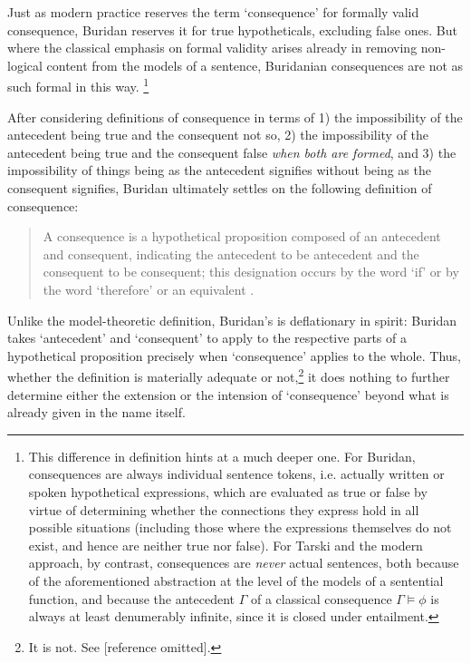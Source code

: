 \documentclass[]{article}
\begin{document}
Just as modern practice reserves the term `consequence' for formally valid consequence, Buridan reserves it for true hypotheticals, excluding false ones\autocite[I. 3, 66]{Buridan2015}. But where the classical emphasis on formal validity arises already in removing non-logical content from the models of a sentence, Buridanian consequences are not as such formal in this way. \footnote{This difference in definition hints at a much deeper one. For Buridan, consequences are always individual sentence tokens, i.e. actually written or spoken hypothetical expressions, which are evaluated as true or false by virtue of determining whether the connections they express hold in all possible situations (including those where the expressions themselves do not exist, and hence are neither true nor false). For Tarski and the modern approach, by contrast, consequences are \textit{never} actual sentences, both because of the aforementioned abstraction at the level of the models of a sentential function, and because the antecedent $\Gamma$ of a classical consequence $\Gamma \models \phi$ is always at least denumerably infinite, since it is closed under entailment.}


After considering definitions of consequence in terms of 1) the impossibility of the antecedent being true and the consequent not so, 2) the impossibility of the antecedent being true and the consequent false \textit{when both are formed}, and 3) the impossibility of things being as the antecedent signifies without being as the consequent signifies, Buridan ultimately settles on the following definition of consequence: 

\begin{quote}
	A consequence is a hypothetical proposition composed of an antecedent and consequent, indicating the antecedent to be antecedent and the consequent to be consequent; this designation occurs by the word `if' or by the word `therefore' or an equivalent \autocite[I. 3, 67]{Buridan2015}.
\end{quote}

Unlike the model-theoretic definition, Buridan's is deflationary in spirit: Buridan takes `antecedent' and `consequent' to apply to the respective parts of a hypothetical proposition precisely when `consequence' applies to the whole. Thus, whether the definition is materially adequate or not,\footnote{It is not. See [reference omitted].} it does nothing to further determine either the extension or the intension of `consequence' beyond what is already given in the name itself.
\end{document}

